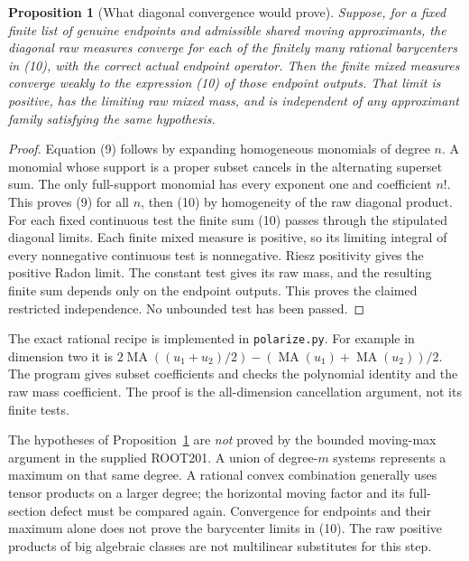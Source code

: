 \documentclass[10pt]{article}
\newtheorem{proposition}[theorem]{Proposition}
\newcommand{\MA}{\operatorname{MA}}
\begin{document}
\begin{proposition}[What diagonal convergence would prove]\label{polarization}
Suppose, for a fixed finite list of genuine endpoints and admissible
shared moving approximants, the diagonal raw measures converge for
each of the finitely many rational barycenters in (10), with the
correct actual endpoint operator. Then the finite mixed measures
converge weakly to the expression (10) of those endpoint outputs.
That limit is positive, has the limiting raw mixed mass, and is
independent of any approximant family satisfying the same hypothesis.
\end{proposition}
\begin{proof}
Equation (9) follows by expanding homogeneous monomials of degree
$n$. A monomial whose support is a proper subset cancels in the
alternating superset sum. The only full-support monomial has every
exponent one and coefficient $n!$. This proves (9) for all $n$,
then (10) by homogeneity of the raw diagonal product.
For each fixed continuous test the finite sum (10) passes through
the stipulated diagonal limits. Each finite mixed measure is
positive, so its limiting integral of every nonnegative continuous
test is nonnegative. Riesz positivity gives the positive Radon
limit. The constant test gives its raw mass, and the resulting finite
sum depends only on the endpoint outputs. This proves the claimed
restricted independence. No unbounded test has been passed.
\end{proof}

The exact rational recipe is implemented in \texttt{polarize.py}.
For example in dimension two it is
$2\MA((u_1+u_2)/2)-(\MA(u_1)+\MA(u_2))/2$.
The program gives subset coefficients and checks the polynomial
identity and the raw mass coefficient. The proof is the all-dimension
cancellation argument, not its finite tests.

The hypotheses of Proposition~\ref{polarization} are \emph{not}
proved by the bounded moving-max argument in the supplied ROOT201.
A union of degree-$m$ systems represents a maximum on that same
degree. A rational convex combination generally uses tensor products
on a larger degree; the horizontal moving factor and its full-section
defect must be compared again. Convergence for endpoints and their
maximum alone does not prove the barycenter limits in (10).
The raw positive products of big algebraic classes are not
multilinear substitutes for this step.
\end{document}

